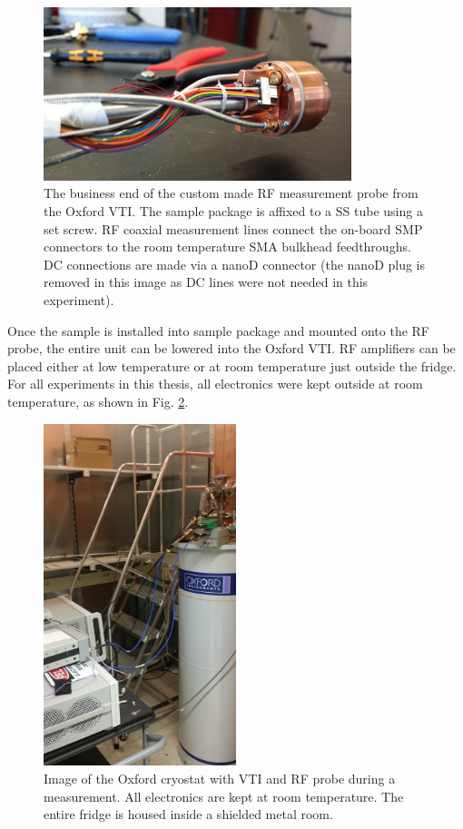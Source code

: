 \begin{figure}
\centering
\includegraphics[width = 0.8\textwidth]{figures/appendix/cryostats/Oxford_probe2.jpg}
\caption{The business end of the custom made RF measurement probe from the Oxford VTI. The sample package is affixed to a SS tube using a set screw. RF coaxial measurement lines connect the on-board SMP connectors to the room temperature SMA bulkhead feedthroughs. DC connections are made via a nanoD connector (the nanoD plug is removed in this image as DC lines were not needed in this experiment).}
\label{Fig:Appen:Oxford_Probe}
\end{figure}

Once the sample is installed into sample package and mounted onto the RF probe, the entire unit can be lowered into the Oxford VTI. RF amplifiers can be placed either at low temperature or at room temperature just outside the fridge. For all experiments in this thesis, all electronics were kept outside at room temperature, as shown in Fig. \ref{Fig:Appen:Oxford}.

\begin{figure}
\centering
\includegraphics[angle=-90, width = 0.5\textwidth]{figures/appendix/cryostats/Oxford.jpg}
\caption{Image of the Oxford cryostat with VTI and RF probe during a measurement. All electronics are kept at room temperature. The entire fridge is housed inside a shielded metal room.}
\label{Fig:Appen:Oxford}
\end{figure}

